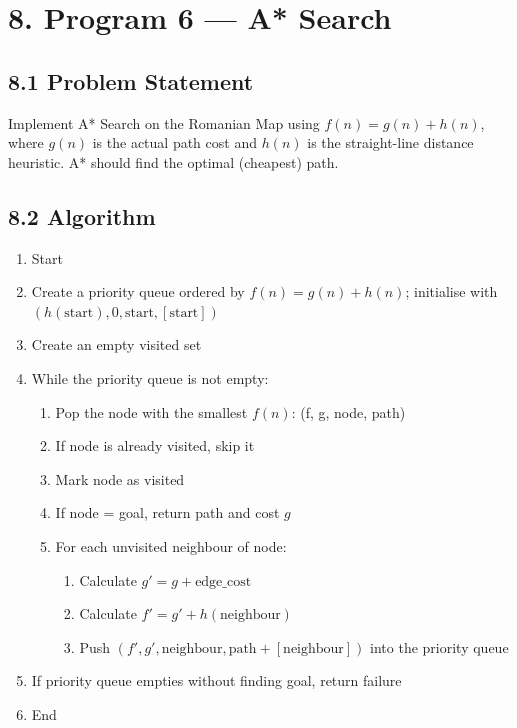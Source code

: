 \documentclass[12pt,a4paper]{article}
\begin{document}
\section*{8. Program 6 --- A* Search}

\subsection*{8.1 Problem Statement}

Implement A* Search on the Romanian Map using $f(n) = g(n) + h(n)$, where $g(n)$ is the actual path cost and $h(n)$ is the straight-line distance heuristic. A* should find the optimal (cheapest) path.

\subsection*{8.2 Algorithm}

\begin{enumerate}[leftmargin=1.6em]
  \item Start
  \item Create a priority queue ordered by $f(n) = g(n) + h(n)$; initialise with $(h(\text{start}), 0, \text{start}, [\text{start}])$
  \item Create an empty visited set
  \item While the priority queue is not empty:
  \begin{enumerate}[leftmargin=1.6em,label=(\alph*)]
    \item Pop the node with the smallest $f(n)$: (f, g, node, path)
    \item If node is already visited, skip it
    \item Mark node as visited
    \item If node = goal, return path and cost $g$
    \item For each unvisited neighbour of node:
    \begin{enumerate}[leftmargin=1.6em,label=\roman*.]
      \item Calculate $g' = g + \text{edge\_cost}$
      \item Calculate $f' = g' + h(\text{neighbour})$
      \item Push $(f', g', \text{neighbour}, \text{path} + [\text{neighbour}])$ into the priority queue
    \end{enumerate}
  \end{enumerate}
  \item If priority queue empties without finding goal, return failure
  \item End
\end{enumerate}
\end{document}
